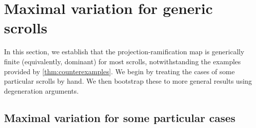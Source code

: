 \documentclass[11pt,reqno]{amsart}
\theoremstyle{plain}
\newtheorem{proposition}[theorem]{Proposition}
\newtheorem{corollary}[theorem]{Corollary}
\theoremstyle{definition}
\theoremstyle{remark}
\numberwithin{equation}{section}
\renewcommand{\to}{{\longrightarrow}}
\numberwithin{equation}{section}
\renewcommand{\O}{\mathcal O}
\begin{document}




\section{Maximal variation for generic scrolls}\label{sec:generic}
In this section, we establish that the projection-ramification map is generically finite (equivalently, dominant) for most scrolls, notwithstanding the examples provided by \autoref{thm:counterexamples}.
We begin by treating the cases of some particular scrolls by hand.
We then bootstrap these to more general results using degeneration arguments.

\subsection{Maximal variation for some particular cases}\label{sec:lowdegree}
\end{document}
